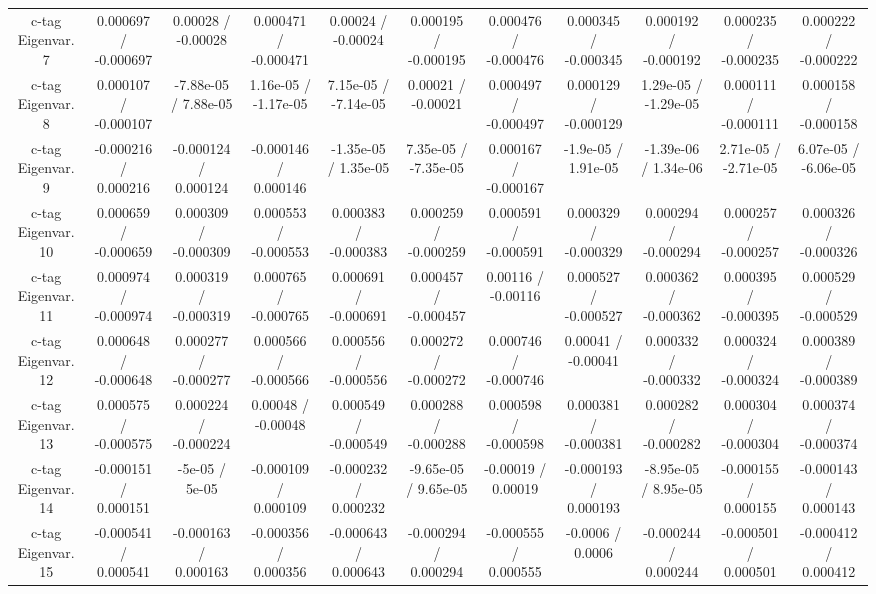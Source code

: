 \begin{table}[htbp]
\begin{center}
\begin{tabular}{|c|c|c|c|c|c|c|c|c|c|c|}
  c-tag Eigenvar. 7 & 0.000697 / -0.000697 & 0.00028 / -0.00028 & 0.000471 / -0.000471 & 0.00024 / -0.00024 & 0.000195 / -0.000195 & 0.000476 / -0.000476 & 0.000345 / -0.000345 & 0.000192 / -0.000192 & 0.000235 / -0.000235 & 0.000222 / -0.000222 \\ 
  c-tag Eigenvar. 8 & 0.000107 / -0.000107 & -7.88e-05 / 7.88e-05 & 1.16e-05 / -1.17e-05 & 7.15e-05 / -7.14e-05 & 0.00021 / -0.00021 & 0.000497 / -0.000497 & 0.000129 / -0.000129 & 1.29e-05 / -1.29e-05 & 0.000111 / -0.000111 & 0.000158 / -0.000158 \\ 
  c-tag Eigenvar. 9 & -0.000216 / 0.000216 & -0.000124 / 0.000124 & -0.000146 / 0.000146 & -1.35e-05 / 1.35e-05 & 7.35e-05 / -7.35e-05 & 0.000167 / -0.000167 & -1.9e-05 / 1.91e-05 & -1.39e-06 / 1.34e-06 & 2.71e-05 / -2.71e-05 & 6.07e-05 / -6.06e-05 \\ 
  c-tag Eigenvar. 10 & 0.000659 / -0.000659 & 0.000309 / -0.000309 & 0.000553 / -0.000553 & 0.000383 / -0.000383 & 0.000259 / -0.000259 & 0.000591 / -0.000591 & 0.000329 / -0.000329 & 0.000294 / -0.000294 & 0.000257 / -0.000257 & 0.000326 / -0.000326 \\ 
  c-tag Eigenvar. 11 & 0.000974 / -0.000974 & 0.000319 / -0.000319 & 0.000765 / -0.000765 & 0.000691 / -0.000691 & 0.000457 / -0.000457 & 0.00116 / -0.00116 & 0.000527 / -0.000527 & 0.000362 / -0.000362 & 0.000395 / -0.000395 & 0.000529 / -0.000529 \\ 
  c-tag Eigenvar. 12 & 0.000648 / -0.000648 & 0.000277 / -0.000277 & 0.000566 / -0.000566 & 0.000556 / -0.000556 & 0.000272 / -0.000272 & 0.000746 / -0.000746 & 0.00041 / -0.00041 & 0.000332 / -0.000332 & 0.000324 / -0.000324 & 0.000389 / -0.000389 \\ 
  c-tag Eigenvar. 13 & 0.000575 / -0.000575 & 0.000224 / -0.000224 & 0.00048 / -0.00048 & 0.000549 / -0.000549 & 0.000288 / -0.000288 & 0.000598 / -0.000598 & 0.000381 / -0.000381 & 0.000282 / -0.000282 & 0.000304 / -0.000304 & 0.000374 / -0.000374 \\ 
  c-tag Eigenvar. 14 & -0.000151 / 0.000151 & -5e-05 / 5e-05 & -0.000109 / 0.000109 & -0.000232 / 0.000232 & -9.65e-05 / 9.65e-05 & -0.00019 / 0.00019 & -0.000193 / 0.000193 & -8.95e-05 / 8.95e-05 & -0.000155 / 0.000155 & -0.000143 / 0.000143 \\ 
  c-tag Eigenvar. 15 & -0.000541 / 0.000541 & -0.000163 / 0.000163 & -0.000356 / 0.000356 & -0.000643 / 0.000643 & -0.000294 / 0.000294 & -0.000555 / 0.000555 & -0.0006 / 0.0006 & -0.000244 / 0.000244 & -0.000501 / 0.000501 & -0.000412 / 0.000412 \\ 

\end{tabular}
\end{center}
\end{table}
